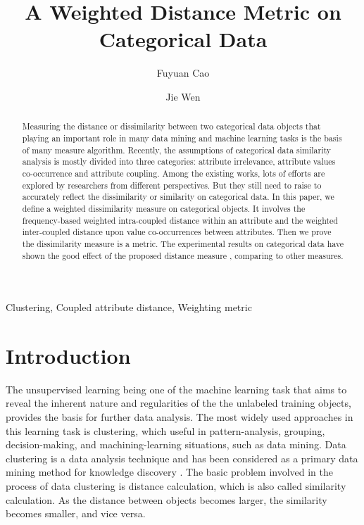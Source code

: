 \documentclass[review]{elsarticle}
\begin{document}
\begin{frontmatter}
\title{A Weighted Distance Metric on Categorical Data}

\author[a]{Fuyuan Cao}

\author[a]{Jie Wen}


\address[a]{Key Laboratory of Computational
Intelligence and Chinese Information Processing of Ministry of
Education, School of Computer and Information Technology, Shanxi
University, Taiyuan 030006, China}

\begin{abstract}
    Measuring the distance or dissimilarity between two categorical data objects that playing an important role in many data mining and machine learning tasks is the basis of many measure algorithm. Recently, the assumptions of categorical data similarity analysis is mostly divided into three categories: attribute irrelevance, attribute values co-occurrence and attribute coupling. Among the existing works, lots of efforts are explored by researchers from different perspectives. But they still need to raise to accurately reflect the dissimilarity or similarity on categorical data. In this paper, we define a weighted dissimilarity measure on categorical objects. It involves the frequency-based weighted intra-coupled distance within an attribute and the weighted inter-coupled distance upon value co-occurrences between attributes. Then we prove the dissimilarity measure is a metric. The experimental results on categorical data have shown the good effect of the proposed distance measure , comparing to other measures.
\end{abstract}
\begin{keyword}
Clustering, Coupled attribute distance, Weighting metric
\end{keyword}

\end{frontmatter}

\section{Introduction}
The unsupervised learning being one of the machine learning task that aims to reveal the inherent nature and regularities of the the unlabeled training objects, provides the basis for further data analysis. The most widely used approaches in this learning task is clustering, which useful in pattern-analysis, grouping, decision-making, and machining-learning situations, such as data mining. Data clustering is a data analysis technique and has been considered as a primary data mining method for knowledge discovery \cite{Labiod2011A}. The basic problem involved in the process of data clustering is distance calculation, which is also called similarity calculation. As the distance between objects becomes larger, the similarity becomes smaller, and vice versa.
\end{document}
